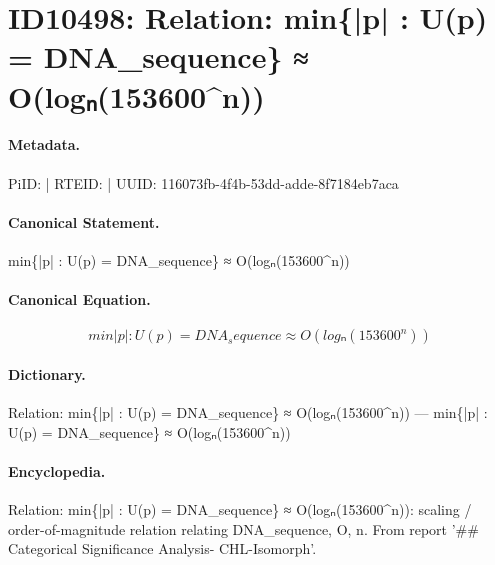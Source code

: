 \section*{ID10498: Relation: min\{|p| : U(p) = DNA\_sequence\} ≈ O(logₙ(153600\textasciicircum{}n))}
\paragraph{Metadata.}
PiID:  | RTEID:  | UUID: 116073fb-4f4b-53dd-adde-8f7184eb7aca

\paragraph{Canonical Statement.}
min\{|p| : U(p) = DNA\_sequence\} ≈ O(logₙ(153600\textasciicircum{}n))

\paragraph{Canonical Equation.}
\[
min{|p| : U(p) = DNA_sequence} ≈ O(logₙ(153600^n))
\]

\paragraph{Dictionary.}
Relation: min\{|p| : U(p) = DNA\_sequence\} ≈ O(logₙ(153600\textasciicircum{}n)) — min\{|p| : U(p) = DNA\_sequence\} ≈ O(logₙ(153600\textasciicircum{}n))

\paragraph{Encyclopedia.}
Relation: min\{|p| : U(p) = DNA\_sequence\} ≈ O(logₙ(153600\textasciicircum{}n)): scaling / order-of-magnitude relation relating DNA\_sequence, O, n. From report '\#\# Categorical Significance Analysis- CHL-Isomorph'.

